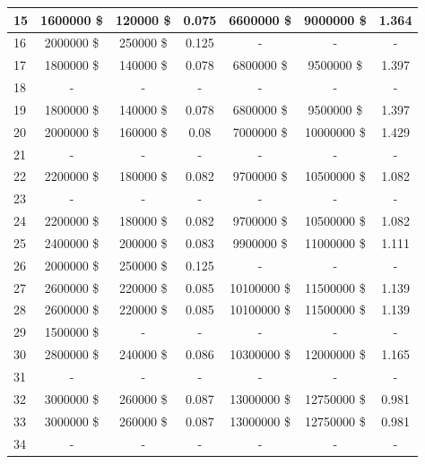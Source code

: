 \documentclass[letterpaper]{article}
\begin{document}
\begin{table}[h]
\begin{tabular}{|l|c|c|c||c|c|c|}
	  \cellcolor[HTML]{FF69B4} 15 & 1600000 \$ & 120000 \$ & 0.075 & 6600000 \$ & 9000000 \$ & 1.364 \\ \hline
	  \cellcolor[HTML]{E6E6FA} 16 & 2000000 \$ & 250000 \$ & 0.125 & - & - & - \\ \hline
	  \cellcolor[HTML]{FF8C00} 17 & 1800000 \$ & 140000 \$ & 0.078 & 6800000 \$ & 9500000 \$ & 1.397 \\ \hline
	  \cellcolor[HTML]{EEEED1} 18  & - & - & - & - & - & - \\ \hline
	  \cellcolor[HTML]{FF8C00} 19 & 1800000 \$ & 140000 \$ & 0.078 & 6800000 \$ & 9500000 \$ & 1.397 \\ \hline
	  \cellcolor[HTML]{FF8C00} 20 & 2000000 \$ & 160000 \$ & 0.08 & 7000000 \$ & 10000000 \$ & 1.429 \\ \hline
	  \cellcolor[HTML]{FFFFFF} 21  & - & - & - & - & - & - \\ \hline
	  \cellcolor[HTML]{FF4500} 22 & 2200000 \$ & 180000 \$ & 0.082 & 9700000 \$ & 10500000 \$ & 1.082 \\ \hline
	  \cellcolor[HTML]{FFC1C1} 23  & - & - & - & - & - & - \\ \hline
	  \cellcolor[HTML]{FF4500} 24 & 2200000 \$ & 180000 \$ & 0.082 & 9700000 \$ & 10500000 \$ & 1.082 \\ \hline
	  \cellcolor[HTML]{FF4500} 25 & 2400000 \$ & 200000 \$ & 0.083 & 9900000 \$ & 11000000 \$ & 1.111 \\ \hline
	  \cellcolor[HTML]{E6E6FA} 26 & 2000000 \$ & 250000 \$ & 0.125 & - & - & - \\ \hline
	  \cellcolor[HTML]{FFD700} 27 & 2600000 \$ & 220000 \$ & 0.085 & 10100000 \$ & 11500000 \$ & 1.139 \\ \hline
	  \cellcolor[HTML]{FFD700} 28 & 2600000 \$ & 220000 \$ & 0.085 & 10100000 \$ & 11500000 \$ & 1.139 \\ \hline
	  \cellcolor[HTML]{FFFFF0} 29 & 1500000 \$ & - & - & - & - & - \\ \hline
	  \cellcolor[HTML]{FFD700} 30 & 2800000 \$ & 240000 \$ & 0.086 & 10300000 \$ & 12000000 \$ & 1.165 \\ \hline
	  \cellcolor[HTML]{BEBEBE} 31  & - & - & - & - & - & - \\ \hline
	  \cellcolor[HTML]{2E8B57} 32 & 3000000 \$ & 260000 \$ & 0.087 & 13000000 \$ & 12750000 \$ & 0.981 \\ \hline
	  \cellcolor[HTML]{2E8B57} 33 & 3000000 \$ & 260000 \$ & 0.087 & 13000000 \$ & 12750000 \$ & 0.981 \\ \hline
	  \cellcolor[HTML]{EEEED1} 34 & - & - & - & - & - & - \\ \hline

\end{tabular}
\end{table}
\end{document}
